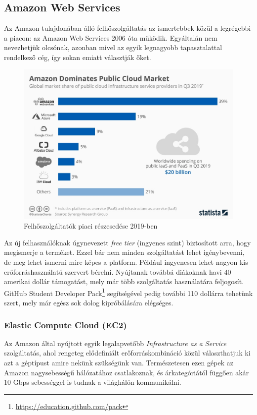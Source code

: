 \subsection{Amazon Web Services}
Az Amazon tulajdonában álló felhőszolgáltatás az ismertebbek közül a legrégebbi a piacon: az Amazon Web Services 2006 óta működik. Egyáltalán nem nevezhetjük olcsónak, azonban mivel az egyik legnagyobb tapasztalattal rendelkező cég, így sokan emiatt választják őket. 
\begin{figure}[ht]
\centering
\includegraphics[width=150mm, keepaspectratio]{img/cloudproviders.jpg}
\caption{Felhőszolgáltatók piaci részesedése 2019-ben\cite{AWSshare}}
\end{figure}
\vskip 0.1in
Az új felhasználóknak úgynevezett \textit{free tier} (ingyenes szint) biztosított arra, hogy megismerje a terméket. Ezzel bár nem minden szolgáltatást lehet igénybevenni, de meg lehet ismerni mire képes a platform. Például ingyenesen lehet nagyon kis erőforráshasználatú szervert bérelni. Nyújtanak továbbá diákoknak havi 40 amerikai dollár támogatást, mely már több szolgáltatás használatára feljogosít. GitHub Student Developer Pack\footnote{\url{https://education.github.com/pack}} segítségével pedig további 110 dollárra tehetünk szert, mely már egész sok dolog kipróbálására elégséges.
\subsubsection{Elastic Compute Cloud (EC2)}
Az Amazon által nyújtott egyik legalapvetőbb \textit{Infrastructure as a Service} szolgáltatás, ahol rengeteg elődefiniált erőforráskombináció közül választhatjuk ki azt a géptípust amire nekünk szükségünk van. Természetesen ezen gépek az Amazon nagysebességű hálózatához csatlakoznak, és árkategóriától függően akár 10 Gbps sebességgel is tudnak a világhálón kommunikálni.
